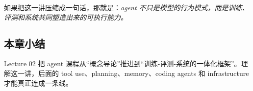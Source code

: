 \documentclass[a4paper]{article}
\begin{document}
如果把这一讲压缩成一句话，那就是：\emph{agent 不只是模型的行为模式，而是训练、评测和系统共同塑造出来的可执行能力。}

\subsection{本章小结}
Lecture 02 把 agent 课程从“概念导论”推进到“训练-评测-系统的一体化框架”。理解这一讲，后面的 tool use、planning、memory、coding agents 和 infrastructure 才能真正连成一条线。
\end{document}
